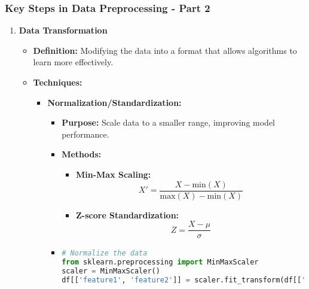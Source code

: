 \documentclass[aspectratio=169]{beamer}
\begin{document}
\begin{frame}
    \frametitle{Key Steps in Data Preprocessing - Part 2}
    \begin{enumerate}[start=2]
        \item \textbf{Data Transformation}
        \begin{itemize}
            \item \textbf{Definition:} Modifying the data into a format that allows algorithms to learn more effectively.
            \item \textbf{Techniques:}
            \begin{itemize}
                \item \textbf{Normalization/Standardization:}
                \begin{itemize}
                    \item \textbf{Purpose:} Scale data to a smaller range, improving model performance.
                    \item \textbf{Methods:}
                    \begin{itemize}
                        \item \textbf{Min-Max Scaling:}  
                        \begin{equation}
                        X' = \frac{X - \text{min}(X)}{\text{max}(X) - \text{min}(X)}
                        \end{equation}
                        \item \textbf{Z-score Standardization:}  
                        \begin{equation}
                        Z = \frac{X - \mu}{\sigma}
                        \end{equation}
                    \end{itemize}
                    \item \begin{lstlisting}[language=Python]
# Normalize the data
from sklearn.preprocessing import MinMaxScaler
scaler = MinMaxScaler()
df[['feature1', 'feature2']] = scaler.fit_transform(df[['feature1', 'feature2']])
                    \end{lstlisting}
                \end{itemize}
            \end{itemize}
        \end{itemize}


\end{enumerate}
\end{frame}
\end{document}
